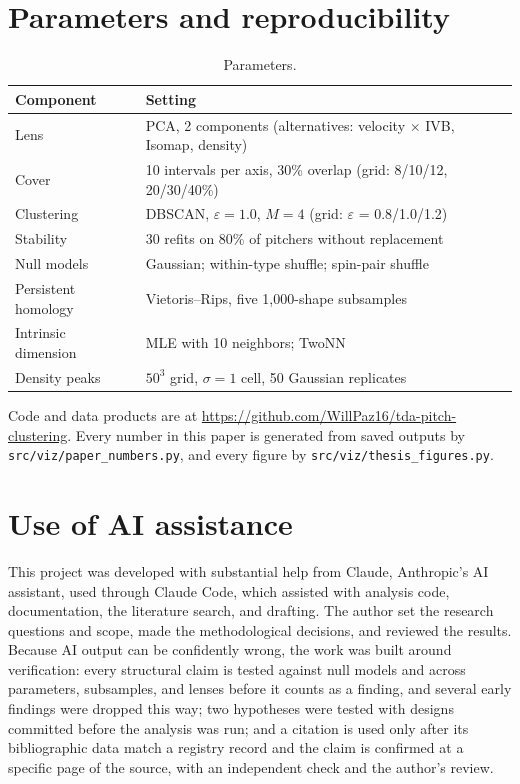 \documentclass{article}
\theoremstyle{definition}
\theoremstyle{remark}
\begin{document}
\appendix
\section{Parameters and reproducibility}
\begin{table}[htbp]
\centering
\begin{tabular}{ll}
\toprule
Component & Setting \\
\midrule
Lens & PCA, 2 components (alternatives: velocity $\times$ IVB, Isomap, density) \\
Cover & 10 intervals per axis, 30\% overlap (grid: 8/10/12, 20/30/40\%) \\
Clustering & DBSCAN, $\varepsilon = 1.0$, $M = 4$ (grid: $\varepsilon$ = 0.8/1.0/1.2) \\
Stability & 30 refits on 80\% of pitchers without replacement \\
Null models & Gaussian; within-type shuffle; spin-pair shuffle \\
Persistent homology & Vietoris--Rips, five 1{,}000-shape subsamples \\
Intrinsic dimension & MLE with 10 neighbors; TwoNN \\
Density peaks & $50^3$ grid, $\sigma = 1$ cell, 50 Gaussian replicates \\
\bottomrule
\end{tabular}
\caption{Parameters.}
\end{table}
Code and data products are at \url{https://github.com/WillPaz16/tda-pitch-clustering}. Every number in this paper is generated from saved outputs by \texttt{src/viz/paper\_numbers.py}, and every figure by \texttt{src/viz/thesis\_figures.py}.

\section{Use of AI assistance}
This project was developed with substantial help from Claude, Anthropic's AI assistant, used through Claude Code, which assisted with analysis code, documentation, the literature search, and drafting.
The author set the research questions and scope, made the methodological decisions, and reviewed the results.
Because AI output can be confidently wrong, the work was built around verification: every structural claim is tested against null models and across parameters, subsamples, and lenses before it counts as a finding, and several early findings were dropped this way; two hypotheses were tested with designs committed before the analysis was run; and a citation is used only after its bibliographic data match a registry record and the claim is confirmed at a specific page of the source, with an independent check and the author's review.

\printbibliography
\end{document}
